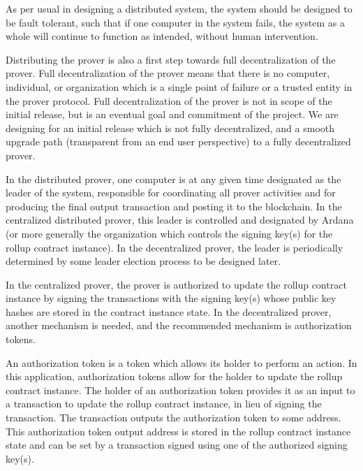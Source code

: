 \documentclass[12pt]{article}
\begin{document}
As per usual in designing a distributed system, the system should be designed to be fault tolerant, such that if one computer in the system fails, the system as a whole will continue to function as intended, without human intervention.

Distributing the prover is also a first step towards full decentralization of the prover. Full decentralization of the prover means that there is no computer, individual, or organization which is a single point of failure or a trusted entity in the prover protocol. Full decentralization of the prover is not in scope of the initial release, but is an eventual goal and commitment of the project. We are designing for an initial release which is not fully decentralized, and a smooth upgrade path (transparent from an end user perspective) to a fully decentralized prover.

In the distributed prover, one computer is at any given time designated as the leader of the system, responsible for coordinating all prover activities and for producing the final output transaction and posting it to the blockchain. In the centralized distributed prover, this leader is controlled and designated by Ardana (or more generally the organization which controls the signing key(s) for the rollup contract instance). In the decentralized prover, the leader is periodically determined by some leader election process to be designed later.

In the centralized prover, the prover is authorized to update the rollup contract instance by signing the transactions with the signing key(s) whose public key hashes are stored in the contract instance state. In the decentralized prover, another mechanism is needed, and the recommended mechanism is authorization tokens.

An authorization token is a token which allows its holder to perform an action. In this application, authorization tokens allow for the holder to update the rollup contract instance. The holder of an authorization token provides it as an input to a transaction to update the rollup contract instance, in lieu of signing the transaction. The transaction outputs the authorization token to some address. This authorization token output address is stored in the rollup contract instance state and can be set by a transaction signed using one of the authorized signing key(s).
\end{document}

